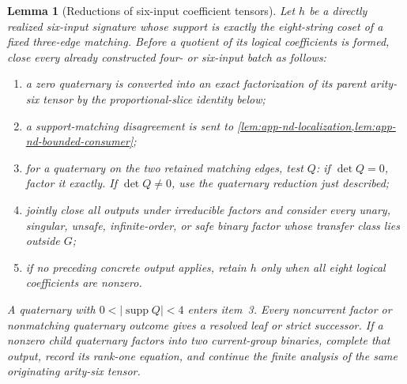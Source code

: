 \documentclass[11pt,letterpaper,onecolumn]{article}
\theoremstyle{plain}
\newtheorem{lemma}[lemma]{Lemma}
\theoremstyle{definition}
\theoremstyle{remark}
\newcommand{\supp}{\operatorname{supp}}
\begin{document}
\begin{lemma}[Reductions of six-input coefficient tensors]
\label{lem:nd-six-coefficient-dispatch}
Let \(h\) be a directly realized six-input signature whose support is exactly the
eight-string coset of a fixed three-edge matching.  Before a quotient of its logical coefficients is
formed, close every already constructed four- or six-input batch as follows:
\begin{enumerate}
\item a zero quaternary is converted into an exact factorization of its parent arity-six tensor by
      the proportional-slice identity below;
\item a support-matching disagreement is sent to
      \cref{lem:app-nd-localization,lem:app-nd-bounded-consumer};
\item for a quaternary on the two retained matching edges, test \(Q\): if
      \(\det Q=0\), factor it exactly. If \(\det Q\ne0\), use the
      quaternary reduction just described;
\item jointly close all outputs under irreducible factors and consider every unary,
      singular, unsafe, infinite-order, or safe binary factor whose transfer class lies outside \(G\);
\item if no preceding concrete output applies, retain \(h\) only when all
      eight logical coefficients are nonzero.
\end{enumerate}
A quaternary with \(0<|\supp Q|<4\) enters item~3.
Every noncurrent factor or nonmatching quaternary outcome gives a resolved leaf or
strict successor.  If a nonzero child quaternary factors into two current-group
binaries, complete that output, record its rank-one equation, and continue the
finite analysis of the same originating arity-six tensor.
\end{lemma}
\end{document}
